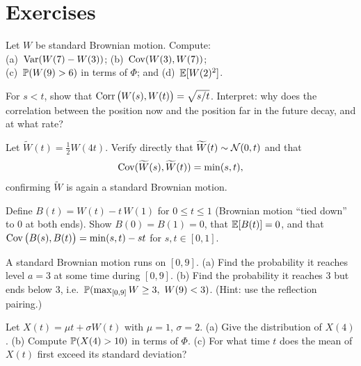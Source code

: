 \section{Exercises}
\label{ch29:exercises}

\begin{exercise}
Let $W$ be standard Brownian motion. Compute: \\
(a)~$\Var(W(7)-W(3))$; (b)~$\Cov(W(3),W(7))$; \\
(c)~$\P(W(9)>6)$ in terms of $\Phi$; and (d)~$\E[W(2)^2]$.
\end{exercise}

\begin{exercise}
For $s<t$, show that
$\Corr\big(W(s),W(t)\big) = \sqrt{s/t}$. Interpret: why does the correlation
between the position now and the position far in the future decay, and at what
rate?
\end{exercise}

\begin{exercise}
Let $\widetilde W(t) = \tfrac{1}{2}W(4t)$. Verify directly that
$\widetilde W(t)\sim\Normal(0,t)$ and that
\[
  \Cov(\widetilde W(s),\widetilde W(t)) = \min(s,t),
\]
confirming $\widetilde W$ is again a standard Brownian motion.
\end{exercise}

\begin{exercise}
Define $B(t) = W(t) - t\,W(1)$ for $0\le t\le1$ (Brownian motion ``tied down'' to
$0$ at both ends). Show $B(0)=B(1)=0$, that $\E[B(t)]=0$, and that
$\Cov\big(B(s),B(t)\big) = \min(s,t) - st$ for $s,t\in[0,1]$.
\end{exercise}

\begin{exercise}
A standard Brownian motion runs on $[0,9]$. (a) Find the probability it reaches
level $a=3$ at some time during $[0,9]$. (b) Find the probability it reaches $3$
but ends below $3$, i.e.\ $\P(\max_{[0,9]}W\ge3,\ W(9)<3)$.
(Hint: use the reflection pairing.)
\end{exercise}

\begin{exercise}
Let $X(t)=\mu t + \sigma W(t)$ with $\mu=1$, $\sigma=2$. (a) Give the distribution
of $X(4)$. (b) Compute $\P(X(4)>10)$ in terms of $\Phi$. (c) For what time $t$
does the mean of $X(t)$ first exceed its standard deviation?
\end{exercise}

